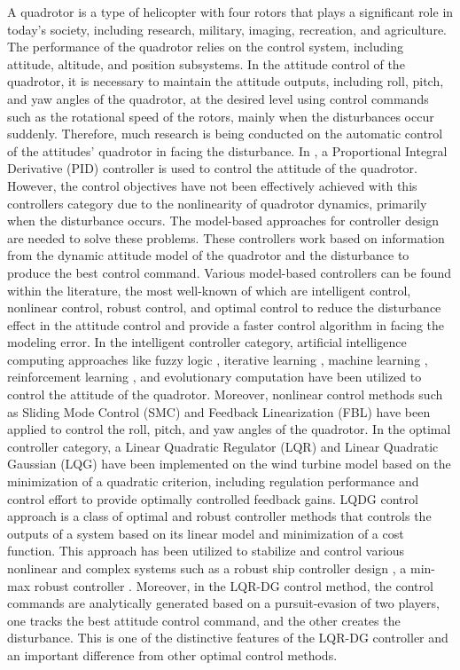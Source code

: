 \documentclass[conference]{IEEEtran}
\begin{document}
A quadrotor is a type of helicopter with four rotors that plays a significant role in today's society, including research, military, imaging, recreation, and agriculture. The performance of the quadrotor relies on the control system, including attitude, altitude, and position subsystems. In the attitude control of the quadrotor, it is necessary to maintain the attitude outputs, including roll, pitch, and yaw angles of the quadrotor, at the desired level using control commands such as the rotational speed of the rotors, mainly when the disturbances occur suddenly. Therefore, much research is being conducted on the automatic control of the attitudes' quadrotor in facing the disturbance.
     In \cite{PID}, a Proportional Integral Derivative (PID) controller is used to control the attitude of the quadrotor. However, the control objectives have not been effectively achieved with this controllers category due to the nonlinearity of quadrotor dynamics, primarily when the disturbance occurs. The model-based approaches \cite{model_base} for controller design are needed to solve these problems. These controllers work based on information from the dynamic attitude model of the quadrotor and the disturbance to produce the best control command.
     Various model-based controllers can be found within the literature, the most well-known of which are intelligent control, nonlinear control, robust control, and optimal control to reduce the disturbance effect in the attitude control and provide a faster control algorithm in facing the modeling error. In the intelligent controller category, artificial intelligence computing approaches like fuzzy logic \cite{fuzzy}, iterative learning \cite{iterative_Learning}, machine learning \cite{machine_learning}, reinforcement learning \cite{Reinforcement_Learning}, and evolutionary computation \cite{Evolutionary} have been utilized to control the attitude of the quadrotor.
     Moreover, nonlinear control methods such as Sliding Mode Control (SMC) \cite{SMC} and Feedback Linearization (FBL) \cite{FBL} have been applied to control the roll, pitch, and yaw angles of the quadrotor. In the optimal controller category, a Linear Quadratic Regulator (LQR) \cite{LQR} and Linear Quadratic Gaussian (LQG) \cite{LQG} have been implemented on the wind turbine model based on the minimization of a quadratic criterion, including regulation performance and control effort to provide optimally controlled feedback gains. 
     LQDG control approach \cite{LQDG} is a class of optimal and robust controller methods that controls the outputs of a system based on its linear model and minimization of a cost function. This approach has been utilized to stabilize and control various nonlinear and complex systems such as a robust ship controller design \cite{LQDG_ship}, a min-max robust controller \cite{robust_LQDG}. Moreover, in the LQR-DG control method, the control commands are analytically generated based on a pursuit-evasion of two players, one tracks the best attitude control command, and the other creates the disturbance. This is one of the distinctive features of the LQR-DG controller and an important difference from other optimal control methods.
\end{document}
